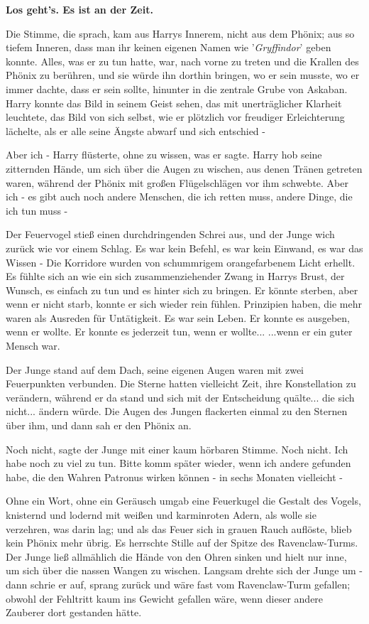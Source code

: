 \textbf{Los geht's. Es ist an der Zeit.
}

Die Stimme, die sprach, kam aus Harrys Innerem, nicht aus dem Phönix; aus so
tiefem Inneren, dass man ihr keinen eigenen Namen wie '\emph{Gryffindor}' geben
konnte. Alles, was er zu tun hatte, war, nach vorne zu treten und die Krallen
des Phönix zu berühren, und sie würde ihn dorthin bringen, wo er sein musste, wo
er immer dachte, dass er sein sollte, hinunter in die zentrale Grube von
Askaban. Harry konnte das Bild in seinem Geist sehen, das mit unerträglicher
Klarheit leuchtete, das Bild von sich selbst, wie er plötzlich vor freudiger
Erleichterung lächelte, als er alle seine Ängste abwarf und sich entschied -

\glqq{}Aber ich -\grqq{} Harry flüsterte, ohne zu wissen, was er sagte. Harry hob
seine zitternden Hände, um sich über die Augen zu wischen, aus denen Tränen
getreten waren, während der Phönix mit großen Flügelschlägen vor ihm schwebte.
\glqq{}Aber ich - es gibt auch noch andere Menschen, die ich retten muss, andere
Dinge, die ich tun muss -\grqq{}

Der Feuervogel stieß einen durchdringenden Schrei aus, und der Junge wich zurück
wie vor einem Schlag. Es war kein Befehl, es war kein Einwand, es war das Wissen
- Die Korridore wurden von schummrigem orangefarbenem Licht erhellt. Es fühlte
sich an wie ein sich zusammenziehender Zwang in Harrys Brust, der Wunsch, es
einfach zu tun und es hinter sich zu bringen. Er könnte sterben, aber wenn er
nicht starb, konnte er sich wieder rein fühlen. Prinzipien haben, die mehr waren
als Ausreden für Untätigkeit. Es war sein Leben. Er konnte es ausgeben, wenn er
wollte. Er konnte es jederzeit tun, wenn er wollte... ...wenn er ein guter
Mensch war.

Der Junge stand auf dem Dach, seine eigenen Augen waren mit zwei Feuerpunkten
verbunden. Die Sterne hatten vielleicht Zeit, ihre Konstellation zu verändern,
während er da stand und sich mit der Entscheidung quälte... die sich nicht...
ändern würde. Die Augen des Jungen flackerten einmal zu den Sternen über ihm,
und dann sah er den Phönix an.

\glqq{}Noch nicht\grqq{}, sagte der Junge mit einer kaum hörbaren Stimme. \glqq{}
Noch nicht. Ich habe noch zu viel zu tun. Bitte komm später wieder, wenn ich
andere gefunden habe, die den Wahren Patronus wirken können - in sechs Monaten
vielleicht -\grqq{}

Ohne ein Wort, ohne ein Geräusch umgab eine Feuerkugel die Gestalt des Vogels,
knisternd und lodernd mit weißen und karminroten Adern, als wolle sie verzehren,
was darin lag; und als das Feuer sich in grauen Rauch auflöste, blieb kein
Phönix mehr übrig. Es herrschte Stille auf der Spitze des Ravenclaw-Turms. Der
Junge ließ allmählich die Hände von den Ohren sinken und hielt nur inne, um sich
über die nassen Wangen zu wischen. Langsam drehte sich der Junge um - dann
schrie er auf, sprang zurück und wäre fast vom Ravenclaw-Turm gefallen; obwohl
der Fehltritt kaum ins Gewicht gefallen wäre, wenn dieser andere Zauberer dort
gestanden hätte.


